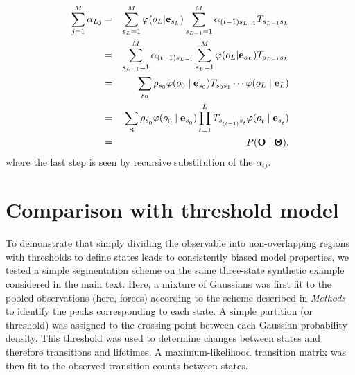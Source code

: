 \documentclass[endfloats,prl,twocolumn,superscriptaddress,nofootinbib,longbibliography]{revtex4-1}
\newcommand{\bfm}[1]{{\bf #1}}
\begin{document}
\begin{eqnarray}
\sum_{j=1}^M \alpha_{Lj} &=& \sum_{s_L=1}^M \varphi(o_L | \bfm{e}_{s_L}) \sum_{s_{L-1}=1}^M \alpha_{(t-1) s_{L-1}} T_{s_{L-1} s_L} \nonumber \\
&=& \sum_{s_{L-1}=1}^M \alpha_{(t-1) s_{L-1}}\sum_{s_L=1}^M \varphi(o_L | \bfm{e}_{s_L})  T_{s_{L-1} s_L} \nonumber \\
&=& \sum_{s_0} \rho_{s_0} \varphi(o_0 \mid \bfm{e}_{s_0}) T_{s_{0} s_{1}} \cdots \varphi(o_L \mid \bfm{e}_L) \nonumber \\
&=& \sum_{\bfm{S}} \rho_{s^{}_{0}} \varphi(o^{}_{0} \mid \bfm{e}_{s^{}_{0}}) \prod_{t=1}^{L^{}} T_{s^{}_{(t-1)} s^{}_{t}} \varphi(o^{}_{t} \mid \bfm{e}_{s^{}_{t}}) \nonumber \\
&=& P(\bfm{O} \mid \bfm{\Theta}) .
\end{eqnarray}
where the last step is seen by recursive substitution of the $\alpha_{tj}$.


\section{Comparison with threshold model}
\label{section:model-system-segmentation}

To demonstrate that simply dividing the observable into non-overlapping regions with thresholds to define states leads to consistently biased model properties, we tested a simple segmentation scheme on the same three-state synthetic example considered in the main text.
Here, a mixture of Gaussians was first fit to the pooled observations (here, forces) according to the scheme described in \emph{Methods} to identify the peaks corresponding to each state.
A simple partition (or threshold) was assigned to the crossing point between each Gaussian probability density.
This threshold was used to determine changes between states and therefore transitions and lifetimes.
A maximum-likelihood transition matrix was then fit to the observed transition counts between states.
\end{document}
